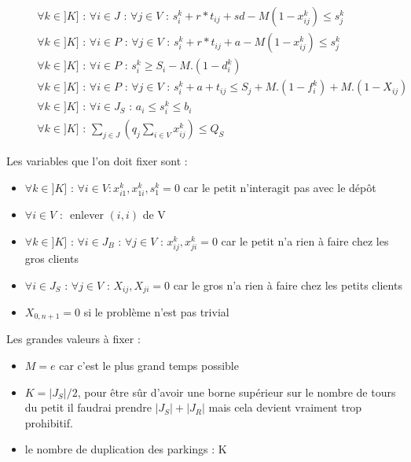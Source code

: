 \documentclass[12pt,a4paper,fleqn]{article}
\begin{document}
\begin{align}
& && \forall k \in ]K] \text{ : } \forall i \in J \text{ : } \forall j \in V \text{ : } s_i^k + r*t_{ij} + sd - M(1-x_{ij}^k) \leqslant s_j^k \label{sequentialitepetit1} \\
& && \forall k \in ]K] \text{ : } \forall i \in P \text{ : } \forall j \in V \text{ : } s_i^k + r*t_{ij} + a - M(1-x_{ij}^k) \leqslant s_j^k \label{sequentialitepetit2} \\
& && \forall k \in ]K] \text{ : } \forall i \in P \text{ : } s_i^k \geqslant S_i - M.(1 - d_i^k) \label{datedebutpetit} \\
& && \forall k \in ]K] \text{ : } \forall i \in P \text{ : } \forall j \in V \text{ : } s_i^k + a + t_{ij} \leqslant S_j + M.(1 - f^k_i) + M.(1 - X_{ij}) \label{datedefinpetit} \\
& && \forall k \in ]K] \text{ : } \forall i \in J_S \text{ : } a_i \leqslant s_i^k \leqslant b_i \label{fenetrepetit} \\
& && \forall k \in ]K] \text{ : } \sum \limits_{j \in J} (q_j \sum \limits_{i \in V} x^k_{ij}) \leqslant Q_S  \label{capa} 
\end{align}

\clearpage

Les variables que l'on doit fixer sont :
\begin{itemize}
\item $\forall k \in ]K] \text{ : } \forall i \in V : x^k_{i1}, x^k_{1i}, s^k_1 = 0$ car le petit n'interagit pas avec le dépôt
\item $\forall i \in V \text{ : }$ enlever $(i,i)$ de V
\item $\forall k \in ]K] \text{ : } \forall i \in J_B \text{ : } \forall j \in V \text{ : } x^k_{ij}, x^k_{ji} = 0$ car le petit n'a rien à faire chez les gros clients
\item $\forall i \in J_S \text{ : } \forall j \in V \text{ : } X_{ij}, X_{ji} = 0$ car le gros n'a rien à faire chez les petits clients
\item $X_{0,n+1} = 0$ si le problème n'est pas trivial
\end{itemize}

Les grandes valeurs à fixer :
\begin{itemize}
\item $M = e$ car c'est le plus grand temps possible
\item $K = |J_S|/2$, pour être sûr d'avoir une borne supérieur sur le nombre de tours du petit il faudrai prendre $|J_S| + |J_R|$ mais cela devient vraiment trop prohibitif.
\item le nombre de duplication des parkings : K
\end{itemize}
\end{document}
